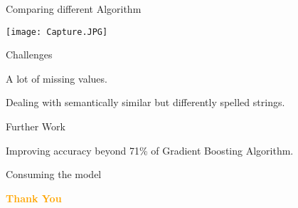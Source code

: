 \documentclass[14pt]{beamer}
\begin{document}
\begin{frame}{Comparing different Algorithm}
\pause
 \begin{fullpageitemize}
 \texttt{[image: Capture.JPG]}
 \end{fullpageitemize}
\end{frame}
\begin{frame}{Challenges}
\pause
\renewcommand{\labelitemi}{$\square$}
 \begin{fullpageitemize}
  \item A lot of missing values. 
  \item Dealing with semantically similar but differently spelled strings. 
 \end{fullpageitemize}
 \end{frame}
 \begin{frame}{Further Work}
\pause
\renewcommand{\labelitemi}{$\square$}
 \begin{fullpageitemize}

   \item Improving accuracy beyond 71\% of Gradient Boosting Algorithm.
  \item Consuming the model

 \end{fullpageitemize}
 \end{frame}
 \begin{frame}{}
 \centering
            \Huge\bfseries
        \textcolor{orange}{Thank You}
\end{frame}
\end{document}
